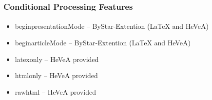 \begin{comment}
*****  [[elisp:(org-cycle)][| ]]  [[elisp:(blee:ppmm:org-mode-toggle)][Nat]] [[elisp:(beginning-of-buffer)][Top]] [[elisp:(delete-other-windows)][(1)]] || /Frame/ *Label=ConditionalProcessingFeatures*  Conditional Processing Features ::  [[elisp:(org-cycle)][| ]]
\end{comment}

\begin{frame}[fragile,label=ConditionalProcessingFeatures]
    \frametitle{Conditional Processing Features}
    \framesubtitle{}

    
    \begin{itemize}
    \item begin{presentationMode}  -- ByStar-Extention (LaTeX and HeVeA)
    \item begin{articleMode} -- ByStar-Extention (LaTeX and HeVeA)
    \end{itemize}

    \begin{itemize}
    \item latexonly  -- HeVeA provided
    \item htmlonly   -- HeVeA provided
    \item rawhtml    -- HeVeA provided
    \end{itemize}

\end{frame}



\begin{comment}
**  [[elisp:(org-cycle)][| ]] [[elisp:(org-show-subtree)][|=]] [[elisp:(show-children 10)][|V]] [[elisp:(bx:orgm:indirectBufOther)][|>]] [[elisp:(bx:orgm:indirectBufMain)][|I]] [[elisp:(blee:ppmm:org-mode-toggle)][|N]] [[elisp:(org-top-overview)][|O]] [[elisp:(progn (org-shifttab) (org-content))][|C]] [[elisp:(delete-other-windows)][|1]]  /Subsection/   Multilingualization Features In Left-To-Right Masters ::  [[elisp:(org-cycle)][| ]]
\end{comment}

